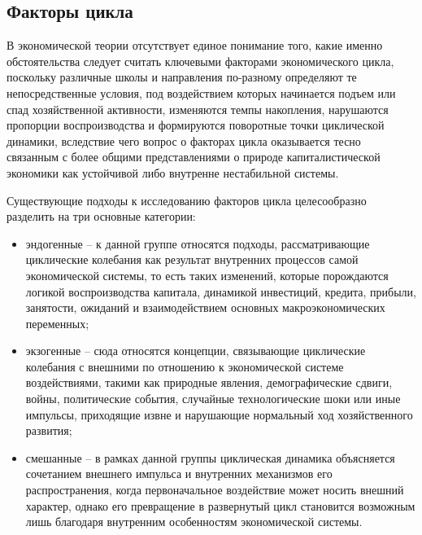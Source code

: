 \subsection{Факторы цикла} %
В экономической теории отсутствует единое понимание того, какие именно обстоятельства следует считать ключевыми факторами экономического цикла, поскольку различные школы и направления по-разному определяют те непосредственные условия, под воздействием которых начинается подъем или спад хозяйственной активности, изменяются темпы накопления, нарушаются пропорции воспроизводства и формируются поворотные точки циклической динамики, вследствие чего вопрос о факторах цикла оказывается тесно связанным с более общими представлениями о природе капиталистической экономики как устойчивой либо внутренне нестабильной системы.

Существующие подходы к исследованию факторов цикла целесообразно разделить на три основные категории:
\begin{itemize}
    \item эндогенные – к данной группе относятся подходы, рассматривающие циклические колебания как результат внутренних процессов самой экономической системы, то есть таких изменений, которые порождаются логикой воспроизводства капитала, динамикой инвестиций, кредита, прибыли, занятости, ожиданий и взаимодействием основных макроэкономических переменных;
    \item экзогенные – сюда относятся концепции, связывающие циклические колебания с внешними по отношению к экономической системе воздействиями, такими как природные явления, демографические сдвиги, войны, политические события, случайные технологические шоки или иные импульсы, приходящие извне и нарушающие нормальный ход хозяйственного развития;
    \item смешанные – в рамках данной группы циклическая динамика объясняется сочетанием внешнего импульса и внутренних механизмов его распространения, когда первоначальное воздействие может носить внешний характер, однако его превращение в развернутый цикл становится возможным лишь благодаря внутренним особенностям экономической системы.
\end{itemize}

